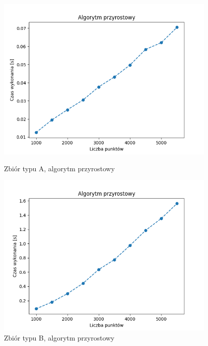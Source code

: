 \documentclass[11pt]{article}
\theoremstyle{remark} \newtheorem{definition}{def.}
\theoremstyle{definition} \newtheorem{twierdzenie}{tw.}
\begin{document}
\begin{figure}[]
    \centering
    \begin{minipage}{0.48\textwidth}
        \centering
        \includegraphics[width=0.95\textwidth]{../tests/chmura-przyrost.png} %
        \caption{Zbiór typu A, algorytm przyrostowy}
        \label{fig:chmura-przyrost}
    \end{minipage}\hfill
    \begin{minipage}{0.48\textwidth}
        \centering
        \includegraphics[width=0.95\textwidth]{../tests/okrag-przyrost.png} %
        \caption{Zbiór typu B, algorytm przyrostowy}
        \label{fig:okrag-przyrost}
    \end{minipage}
\end{figure}
\end{document}
